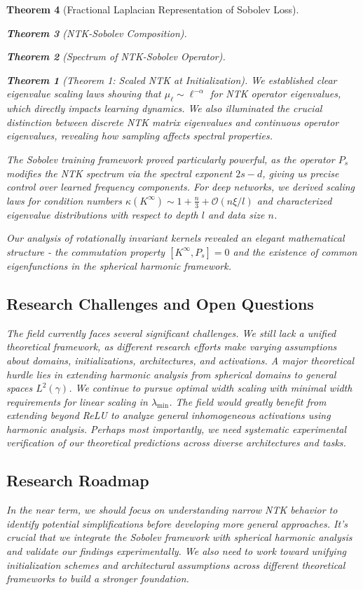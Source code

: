\documentclass{article}
\newtheorem{theorem}{Theorem}[section]
\begin{document}
\begin{theorem}[Fractional Laplacian Representation of Sobolev Loss]
\begin{theorem}[NTK-Sobolev Composition]
\begin{theorem}[Spectrum of NTK-Sobolev Operator]
\begin{theorem}[Theorem 1: Scaled NTK at Initialization]
We established clear eigenvalue scaling laws showing that $\mu_\ell \sim \ell^{-\alpha}$ for NTK operator eigenvalues, which directly impacts learning dynamics. We also illuminated the crucial distinction between discrete NTK matrix eigenvalues and continuous operator eigenvalues, revealing how sampling affects spectral properties.

The Sobolev training framework proved particularly powerful, as the operator $P_s$ modifies the NTK spectrum via the spectral exponent $2s-d$, giving us precise control over learned frequency components. For deep networks, we derived scaling laws for condition numbers $\kappa(K^{\infty}) \sim 1 + \frac{n}{3} + \mathcal{O}(n \xi / l)$ and characterized eigenvalue distributions with respect to depth $l$ and data size $n$.

Our analysis of rotationally invariant kernels revealed an elegant mathematical structure - the commutation property $[K^{\infty}, P_s] = 0$ and the existence of common eigenfunctions in the spherical harmonic framework.

\subsection{Research Challenges and Open Questions}

The field currently faces several significant challenges. We still lack a unified theoretical framework, as different research efforts make varying assumptions about domains, initializations, architectures, and activations. A major theoretical hurdle lies in extending harmonic analysis from spherical domains to general spaces $L^2(\gamma)$. We continue to pursue optimal width scaling with minimal width requirements for linear scaling in $\lambda_{\min}$. The field would greatly benefit from extending beyond ReLU to analyze general inhomogeneous activations using harmonic analysis. Perhaps most importantly, we need systematic experimental verification of our theoretical predictions across diverse architectures and tasks.

\subsection{Research Roadmap}

In the near term, we should focus on understanding narrow NTK behavior to identify potential simplifications before developing more general approaches. It's crucial that we integrate the Sobolev framework with spherical harmonic analysis and validate our findings experimentally. We also need to work toward unifying initialization schemes and architectural assumptions across different theoretical frameworks to build a stronger foundation.


\end{theorem}
\end{theorem}
\end{theorem}
\end{theorem}
\end{document}
